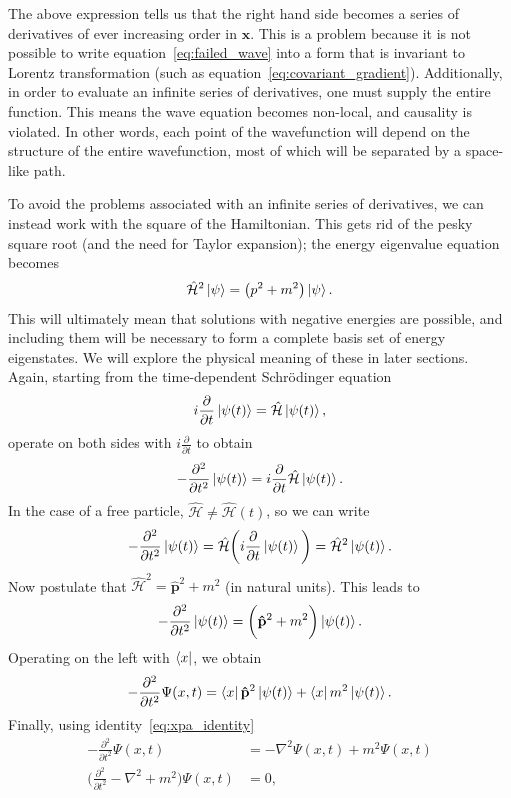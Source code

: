 \documentclass[titlepage,letterpaper,onecolumn,11pt,final]{report}
\newcommand{\Pm}{\hat{p}}
\newcommand{\Ham}{\hat{\mathcal{H}}}
\numberwithin{equation}{section}
\numberwithin{figure}{section}
\begin{document}
The above expression tells us that the right hand side becomes a series of derivatives of ever increasing order in $\mathbf{x}$. This is a problem because it is not possible to write equation~\ref{eq:failed_wave} into a form that is invariant to Lorentz transformation (such as equation~\ref{eq:covariant_gradient}). Additionally, in order to evaluate an infinite series of derivatives, one must supply the entire function. This means the wave equation becomes non-local, and causality is violated. In other words, each point of the wavefunction will depend on the structure of the entire wavefunction, most of which will be separated by a space-like path.

To avoid the problems associated with an infinite series of derivatives, we can instead work with the square of the Hamiltonian. This gets rid of the pesky square root (and the need for Taylor expansion); the energy eigenvalue equation becomes
\begin{gather}
	\label{eq:square_Ham}
	\Ham^{2} \ket{\psi} = \left(p^{2} + m^{2}\right) \ket{\psi}.
\end{gather}
%
This will ultimately mean that solutions with negative energies are possible, and including them will be necessary to form a complete basis set of energy eigenstates. We will explore the physical meaning of these in later sections. Again, starting from the time-dependent Schr\"{o}dinger equation
\begin{gather}
	i \frac{\partial}{\partial t} \ket{\psi (t)} = \Ham \ket{\psi (t)} ,
\end{gather}
%
operate on both sides with $i \frac{\partial}{\partial t}$ to obtain
\begin{gather}
	- \frac{\partial^{2}}{\partial t^{2}} \ket{\psi (t)} = i \frac{\partial}{\partial t} \Ham \ket{\psi (t)} .
\end{gather}
%
In the case of a free particle, $\Ham \neq \Ham (t)$, so we can write
\begin{gather}
	- \frac{\partial^{2}}{\partial t^{2}} \ket{\psi (t)} = \Ham \bigg( i \frac{\partial}{\partial t} \ket{\psi (t)} \bigg) = \Ham^{2} \ket{\psi (t)} .
\end{gather}
%
Now postulate that $\Ham^{2} = \mathbf{\Pm}^{2} + m^{2}$ (in natural units). This leads to
\begin{gather}
	- \frac{\partial^{2}}{\partial t^{2}} \ket{\psi (t)} = \bigg( \mathbf{\Pm}^{2} + m^{2} \bigg) \ket{\psi (t)} .
\end{gather}
%
Operating on the left with $\bra{x}$, we obtain
\begin{gather*}
	- \frac{\partial^{2}}{\partial t^{2}} \Psi (x,t) =  \bra{x} \mathbf{\Pm}^{2} \ket{\psi (t)} + \bra{x} m^{2} \ket{\psi (t)} .
\end{gather*}
%
Finally, using identity~\ref{eq:xpa_identity}
\begin{subequations}
\begin{align}
	- \frac{\partial^{2}}{\partial t^{2}} \Psi (x,t) &=  -\nabla^{2} \Psi (x,t) + m^{2} \Psi (x,t) \\
	\label{eq:Klein_Gordon}
	\bigg( \frac{\partial^{2}}{\partial t^{2}} - \nabla^{2} + m^{2} \bigg) \Psi (x,t) &= 0 ,
\end{align}
\end{subequations}
\end{document}
